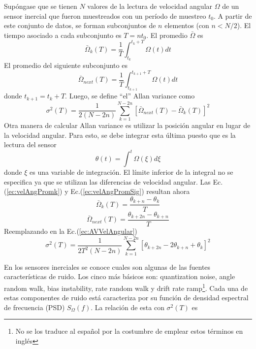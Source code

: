 \documentclass[a4paper,11pt,twoside]{IT-CNEA}
\begin{document}
Supóngase que se tienen $N$ valores de la lectura de velocidad angular $\Omega$ de un sensor inercial que fueron muestreados con un período de muestreo $t_0$. A partir de este conjunto de datos, se forman subconjuntos de $n$ elementos (con $n<N/2$). El tiempo asociado a cada subconjunto es $T=nt_0$. El promedio $\bar{\Omega}$ es
\begin{equation}
\bar{\Omega}_k(T)=\frac{1}{T}\int_{t_k}^{t_k+T}\Omega(t)dt
\label{ec:velAngPromk}
\end{equation}
El promedio del siguiente subconjunto es
\begin{equation}
\bar{\Omega}_{next}(T)=\frac{1}{T}\int_{t_{k+1}}^{t_{k+1}+T}\Omega(t)dt
\label{ec:velAngPromSig}
\end{equation}
donde $t_{k+1}=t_k+T$. Luego, se define ``el'' Allan variance como
\begin{equation}
\sigma^2(T)=\frac{1}{2\left( N-2n\right)}\sum_{k=1}^{N-2n}\left[\bar{\Omega}_{next}(T)- \bar{\Omega}_k(T)\right]^2
\label{ec:AVVelAngular}
\end{equation}
Otra manera de calcular Allan variance es utilizar la posición angular en lugar de la velocidad angular. Para esto, se debe integrar esta última puesto que es la lectura del sensor
\begin{equation}
\theta(t)=\int^t\Omega(\xi)d\xi
\end{equation}
donde $\xi$ es una variable de integración. El límite inferior de la integral no se especifica ya que se utilizan las diferencias de velocidad angular. Las Ec.(\ref{ec:velAngPromk}) y Ec.(\ref{ec:velAngPromSig}) resultan ahora
\begin{equation}
\bar{\Omega}_{k}(T)=\frac{\theta_{k+n}-\theta_k}{T}
\end{equation}
\begin{equation}
\bar{\Omega}_{next}(T)=\frac{\theta_{k+2n}-\theta_{k+n}}{T}
\end{equation}
Reemplazando en la Ec.(\ref{ec:AVVelAngular})
\begin{equation}
\sigma^2(T)=\frac{1}{2T^2\left( N-2n\right)}\sum_{k=1}^{N-2n}\left[ \theta_{k+2n}-2\theta_{k+n}+\theta_k \right]^2
\label{ec:AVPosAngular}
\end{equation}
\par En los sensores inerciales se conoce cuales son algunas de las fuentes características de ruido. Los cinco más básicos son: quantization noise, angle random walk, bias instability, rate random walk y drift rate ramp\footnote{No se los traduce al español por la costumbre de emplear estos términos en inglés}. Cada una de estas componentes de ruido está caracteriza por su función de densidad espectral de frecuencia (PSD) $S_{\Omega}(f)$. La relación de esta con $\sigma^2(T)$  es
\end{document}
